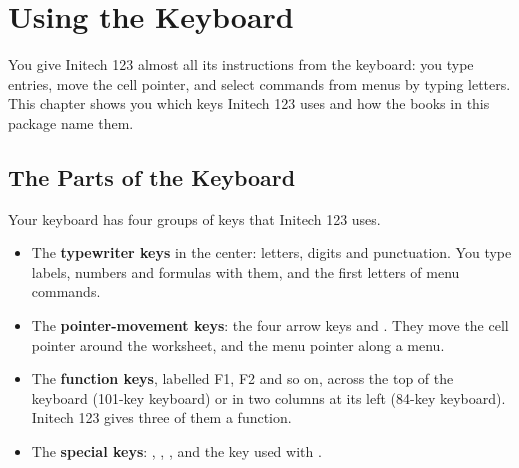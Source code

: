 \chapter{Using the Keyboard}

You give Initech 123 almost all its instructions from the keyboard: you
type entries, move the cell pointer, and select commands from menus by
typing letters.  This chapter shows you which keys Initech 123 uses and how
the books in this package name them.

\section{The Parts of the Keyboard}
Your keyboard has four groups of keys that Initech 123 uses.
\begin{itemize}
\item The \textbf{typewriter keys} in the center: letters, digits and
  punctuation.  You type labels, numbers and formulas with them, and the
  first letters of menu commands.
\item The \textbf{pointer-movement keys}: the four arrow keys and
  .  They move the cell pointer around the worksheet, and the
  menu pointer along a menu.
\item The \textbf{function keys}, labelled F1, F2 and so on, across the
  top of the keyboard (101-key keyboard) or in two columns at its left
  (84-key keyboard).  Initech 123 gives three of them a function.
\item The \textbf{special keys}: , ,
  , and the  key used with .
\end{itemize}

